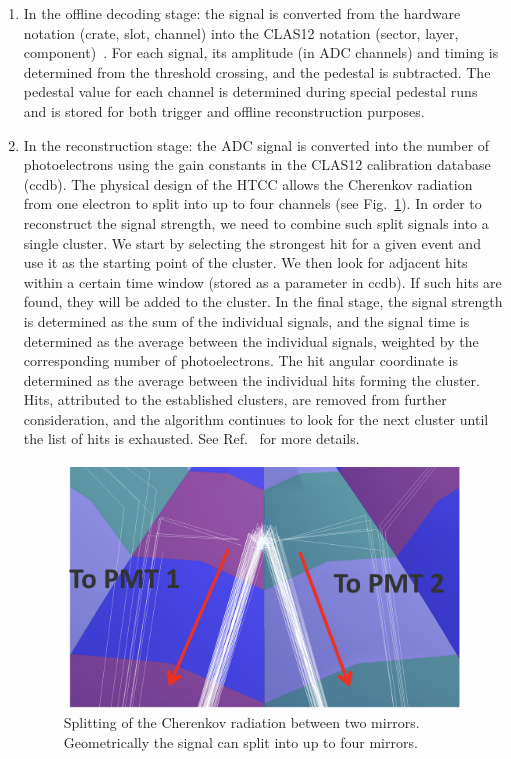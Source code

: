 \begin{enumerate}
\item In the offline decoding stage: the signal is converted from the hardware notation (crate, slot, channel) into the
  CLAS12 notation (sector, layer, component)~\cite{recon-nim}. For each signal, its amplitude (in ADC channels) and
  timing is determined from the threshold crossing, and the pedestal is subtracted. The pedestal value for each
  channel is determined during special pedestal runs and is stored for both trigger and offline reconstruction
  purposes.
\item In the reconstruction stage: the ADC signal is converted into the number of photoelectrons using the
  gain constants in the CLAS12 calibration database (ccdb). The physical design of the HTCC allows the Cherenkov
  radiation from one electron to split into up to four channels (see Fig.~\ref{fig:htccClustersSplit}). In order to
  reconstruct the signal strength, we need to combine such split signals into a single cluster. We start by selecting
  the strongest hit for a given event and use it as the starting point of the cluster. We then look for adjacent hits
  within a certain time window (stored as a parameter in ccdb). If such hits are found, they will be added to
  the cluster. In the final stage, the signal strength is determined as the sum of the individual signals, and the signal
  time is determined as the average between the individual signals, weighted by the corresponding number of 
  photoelectrons. The hit angular coordinate is determined as the average between the individual hits forming the
  cluster. Hits, attributed to the established clusters, are removed from further consideration, and the algorithm
  continues to look for the next cluster until the list of hits is exhausted. See Ref.~\cite{recon-nim} for more
  details.

\begin{figure}[ht]
\centering
\includegraphics[width=0.95\linewidth]{images/htccClustersSplit.png}
\caption{Splitting of the Cherenkov radiation between two mirrors. Geometrically the signal can split into up to four
  mirrors.}
\label{fig:htccClustersSplit}
\end{figure}
\end{enumerate}
